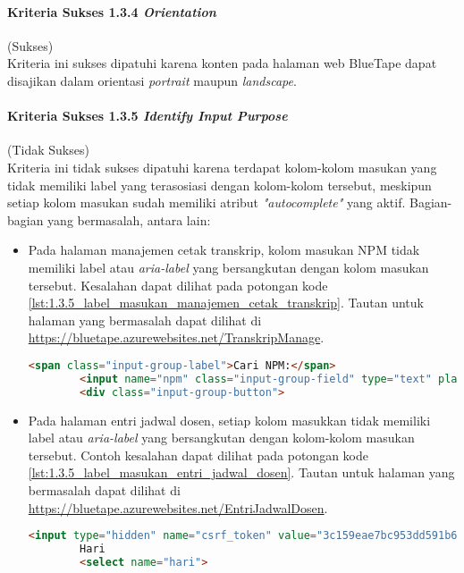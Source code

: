 \paragraph{Kriteria Sukses 1.3.4 \textit{Orientation}}
\label{par:kepatuhan_bluetape_kriteria_sukses_1.3.4}
(Sukses)\\

Kriteria ini sukses dipatuhi karena konten pada halaman web BlueTape dapat disajikan dalam orientasi \textit{portrait} maupun \textit{landscape}.

\paragraph{Kriteria Sukses 1.3.5 \textit{Identify Input Purpose}}
\label{par:kepatuhan_bluetape_kriteria_sukses_1.3.5}
(Tidak Sukses)\\

Kriteria ini tidak sukses dipatuhi karena terdapat kolom-kolom masukan yang tidak memiliki label yang terasosiasi dengan kolom-kolom tersebut, meskipun setiap kolom masukan sudah memiliki atribut \textit{"autocomplete"} yang aktif. Bagian-bagian yang bermasalah, antara lain:
\begin{itemize}
    \item Pada halaman manajemen cetak transkrip, kolom masukan NPM tidak memiliki label atau \textit{aria-label} yang bersangkutan dengan kolom masukan tersebut. Kesalahan dapat dilihat pada potongan kode \ref{lst:1.3.5_label_masukan_manajemen_cetak_transkrip}. Tautan untuk halaman yang bermasalah dapat dilihat di \url{https://bluetape.azurewebsites.net/TranskripManage}.
    \begin{lstlisting}[frame=single, label={lst:1.3.5_label_masukan_manajemen_cetak_transkrip}, language=HTML, caption=Kriteria Sukses 1.3.5 - Tidak Terdapat Label pada Kolom Masukan di Halaman Manajemen Cetak Transkrip]
        <span class="input-group-label">Cari NPM:</span>
        <input name="npm" class="input-group-field" type="text" placeholder="2013730013" maxlength="10" minlength="10"/>
        <div class="input-group-button">
    \end{lstlisting}
    
    \item Pada halaman entri jadwal dosen, setiap kolom masukkan tidak memiliki label atau \textit{aria-label} yang bersangkutan dengan kolom-kolom masukan tersebut. Contoh kesalahan dapat dilihat pada potongan kode \ref{lst:1.3.5_label_masukan_entri_jadwal_dosen}. Tautan untuk halaman yang bermasalah dapat dilihat di \url{https://bluetape.azurewebsites.net/EntriJadwalDosen}.
    \begin{lstlisting}[frame=single, label={lst:1.3.5_label_masukan_entri_jadwal_dosen}, language=HTML, caption=Kriteria Sukses 1.3.5 - Tidak Terdapat Label pada Kolom Masukan di Halaman Entri Jadwal Dosen]
        <input type="hidden" name="csrf_token" value="3c159eae7bc953dd591b679c080ed066" />
        Hari
        <select name="hari">
    \end{lstlisting}
\end{itemize}

